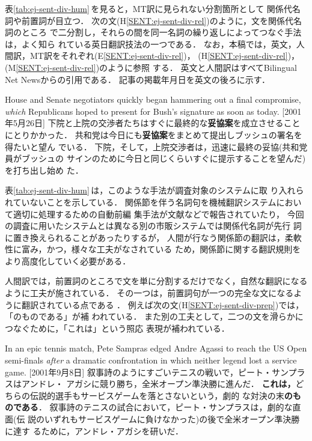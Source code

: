 表\ref{tab:ej-sent-div-hum}\,を見ると，MT訳に見られない分割箇所として
関係代名詞や前置詞が目立つ．
次の文(H\ref{SENT:ej-sent-div-rel})のように，文を関係代名詞のところ
で二分割し，それらの間を同一名詞の繰り返しによってつなぐ手法は，よく知ら
れている英日翻訳技法の一つである\cite{Anzai82,Kondo92,Kamei94}． 
なお，本稿では，英文，人間訳，MT訳をそれぞれ(E\ref{SENT:ej-sent-div-rel})，
(H\ref{SENT:ej-sent-div-rel})，(M\ref{SENT:ej-sent-div-rel})のように参照
する．
英文と人間訳はすべてBilingual Net Newsからの引用である．
記事の掲載年月日を英文の後ろに示す．
\begin{SENT2}
\sentE House and Senate negotiators quickly began hammering out a final 
compromise, {\it which} Republicans hoped to present for Bush's 
signature as soon as today. [2001年5月26日]
\sentH 下院と上院の交渉者たちはすぐに最終的な{\bf 妥協案}を成立させること
にとりかかった．
共和党は今日にも{\bf 妥協案}をまとめて提出しブッシュの署名を得たいと望ん
でいる． 
\sentM 下院，そして，上院交渉者は，迅速に最終の妥協(共和党員がブッシュの
サインのために今日と同じくらいすぐに提示することを望んだ)を打ち出し始め
た． 
\label{SENT:ej-sent-div-rel}
\end{SENT2}

表\ref{tab:ej-sent-div-hum}\,は，このような手法が調査対象のシステムに取
り入れられていないことを示している．
関係節を伴う名詞句を機械翻訳システムにおいて適切に処理するための自動前編
集手法が文献\cite{KatoTerumasa97,Saraki01}などで報告されていたり，
今回の調査に用いたシステムとは異なる別の市販システムでは関係代名詞が先行
詞に置き換えられることがあったりするが，
人間が行なう関係節の翻訳は，柔軟性に富み，かつ，様々な工夫がなされている
ため，関係節に関する翻訳規則をより高度化していく必要がある．

人間訳では，前置詞のところで文を単に分割するだけでなく，自然な翻訳になる
ように工夫が施されている．
その一つは，前置詞句が一つの完全な文になるように翻訳されている点である
\cite{Nakamura82}．
例えば次の文(H\ref{SENT:ej-sent-div-prep})では，「のものである」が補
われている．
また別の工夫として，二つの文を滑らかにつなぐために，「これは」という照応
表現が補われている．
\begin{SENT2}
\sentE In an epic tennis match, Pete Sampras edged Andre Agassi to reach 
the US Open semi-finals {\it after} a dramatic confrontation in which 
neither legend lost a service game. [2001年9月8日]
\sentH 叙事詩のようにすごいテニスの戦いで，ピート・サンプラスはアンドレ・
アガシに競り勝ち，全米オープン準決勝に進んだ．
{\bf これは，}どちらの伝説的選手もサービスゲームを落とさないという，劇的
な対決の末{\bf のものである}．
\sentM 叙事詩のテニスの試合において，ピート・サンプラスは，劇的な直面(伝
説のいずれもサービスゲームに負けなかった)の後で全米オープン準決勝に達す
るために，アンドレ・アガシを研いだ．
\label{SENT:ej-sent-div-prep}
\end{SENT2}


